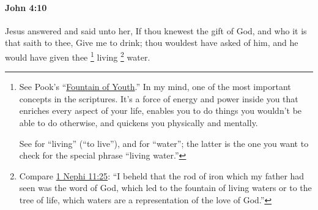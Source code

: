 		\paragraph{John 4:10} %
			\label{JOHN-4-10}

			Jesus answered and said unto her, If thou knewest the gift of God, and who it is that saith to thee, Give me to drink; thou wouldest have asked of him, and he would have given thee 
				\footnote{%
					See Pook's ``\hyperref[TTW-LIFE-ENERGY-0001]{Fountain of Youth}.'' In my mind, one of the most important concepts in the scriptures. It's a force of energy and power inside you that enriches every aspect of your life, enables you to do things you wouldn't be able to do otherwise, and quickens you physically and mentally.
					
					See \hyperref[ZAO]{} for ``living'' (``to live''), and \hyperref[HUDOR]{} for ``water''; the latter is the one you want to check for the special phrase ``living water.'' 
					}%
			living%
				\footnote{%
					Compare \hyperref[1NEPHI-11-25]{1 Nephi 11:25}: ``I beheld that the rod of iron which my father had seen was the word of God, which led to the fountain of living waters or to the tree of life, which waters are a representation of the love of God.''
					}
			water.

			\begin{framed}
			\scriptsize
				\begin{compactdesc}
					\item[SBLG] 
				\end{compactdesc}
			\end{framed}


